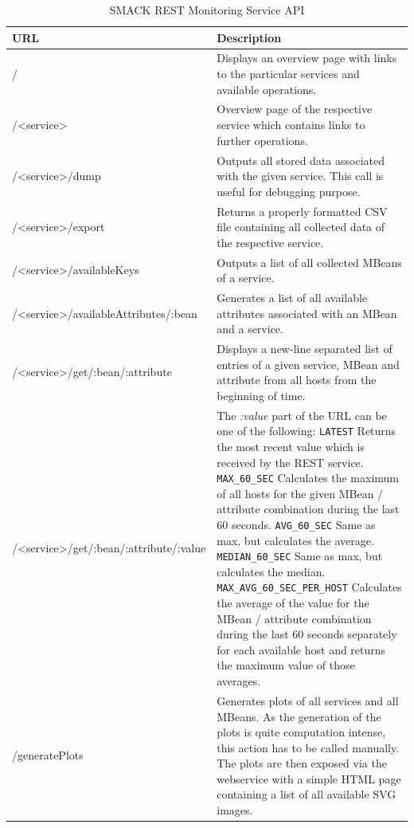 \begin{table}[]
\setlength{\extrarowheight}{.5em}
\begin{tabular}{@{}lp{8cm}@{}}
\toprule
URL & Description \\ \midrule
/                                       & Displays an overview page with links to the particular services and available operations.  \\
/<service>                              & Overview page of the respective service which contains links to further operations. \\
/<service>/dump                         & Outputs all stored data associated with the given service. This call is useful for debugging purpose. \\
/<service>/export                       & Returns a properly formatted CSV file containing all collected data of the respective service. \\
/<service>/availableKeys                & Outputs a list of all collected MBeans of a service. \\
/<service>/availableAttributes/:bean    & Generates a list of all available attributes associated with an MBean and a service. \\
/<service>/get/:bean/:attribute         & Displays a new-line separated list of entries of a given service, MBean and attribute from all hosts from the beginning of time. \\
/<service>/get/:bean/:attribute/:value  & The \textit{:value} part of the URL can be one of the following: \newline
                                          \verb|LATEST| Returns the most recent value which is received by the REST service. \newline
                                          \verb|MAX_60_SEC| Calculates the maximum of all hosts for the given MBean / attribute combination during the last 60 seconds. \newline
                                          \verb|AVG_60_SEC| Same as max, but calculates the average. \newline
                                          \verb|MEDIAN_60_SEC| Same as max, but calculates the median. \newline
                                          \verb|MAX_AVG_60_SEC_PER_HOST| Calculates the average of the value for the MBean / attribute combination during the last 60 seconds separately for each available host and returns the maximum value of those averages. \\
/generatePlots                          & Generates plots of all services and all MBeans.
                                          As the generation of the plots is quite computation intense, this action has to be called manually.
                                          The plots are then exposed via the webservice with a simple HTML page containing a list of all available SVG images.\\
\bottomrule
\end{tabular}
\centering
\caption{SMACK REST Monitoring Service API}
\label{tab:rest}
\end{table}




